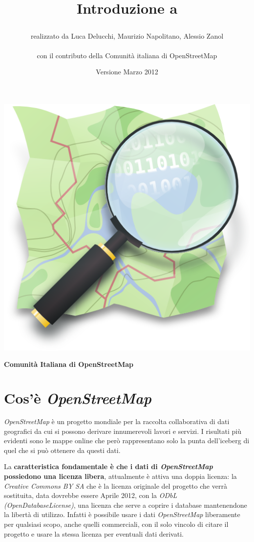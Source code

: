 \documentclass[a4paper,twoside,12pt,]{article}
\title{\begin{Large}\textbf{Introduzione a \osm}\end{Large}}
\date{\small{Versione Marzo 2012}}
\author{realizzato da Luca Delucchi, Maurizio Napolitano, Alessio Zanol \\ \\ con il contributo della Comunità italiana di OpenStreetMap}
\newcommand{\osm}{\emph{OpenStreetMap}\xspace}
\newcommand{\pro}[1]{\emph{#1}}
\begin{document}
\maketitle
\begin{center}
\includegraphics{osm_logo_new.png}
\end{center}
\begin{center}
	\begin{large}
	\textbf{Comunità Italiana di OpenStreetMap}
	\end{large}
\end{center}
\newpage

\section{Cos'è \osm}
\osm è un progetto mondiale per la raccolta collaborativa di dati geografici da cui si possono derivare innumerevoli lavori e servizi. I risultati più evidenti sono le mappe online che però rappresentano solo la punta dell'iceberg di quel che si può ottenere da questi dati.

La \textbf{caratteristica fondamentale è che i dati di \osm possiedono una licenza libera}, attualmente è attiva una doppia licenza: la \pro{Creative Commons BY SA} che è la licenza originale del progetto che verrà sostituita, data dovrebbe essere Aprile 2012, con la \pro{ODbL (OpenDatabaseLicense)}, una licenza che serve a coprire i database mantenendone la libertà di utilizzo. Infatti è possibile usare i dati \osm liberamente per qualsiasi scopo, anche quelli commerciali, con il solo vincolo di citare il progetto e usare la stessa licenza per eventuali dati derivati. 
\end{document}
